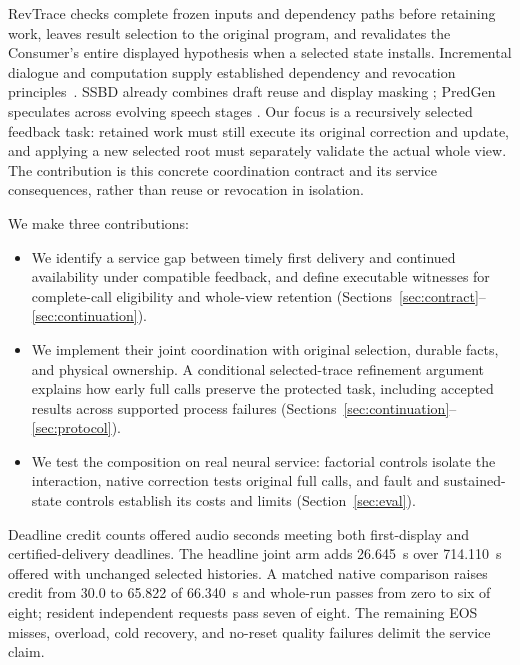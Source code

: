 RevTrace checks complete frozen inputs and dependency paths before
retaining work, leaves result selection to the original program, and
revalidates the Consumer's entire displayed hypothesis when a selected
state installs.
Incremental dialogue and computation supply established dependency and
revocation principles~\cite{schlangen2011incremental,hammer2014adapton,hammer2015names}.
SSBD already combines draft reuse and display masking
\cite{zeng2026ssbd}; PredGen speculates across evolving speech stages
\cite{li2025predgen}. Our focus is a recursively selected feedback task:
retained work must still execute its original correction and update, and
applying a new selected root must separately validate the actual whole
view. The contribution is this concrete coordination contract and its
service consequences, rather than reuse or revocation in isolation.

We make three contributions:
\begin{itemize}
\item We identify a service gap between timely first delivery and continued
  availability under compatible feedback, and define executable witnesses
  for complete-call eligibility and whole-view retention
  (Sections~\ref{sec:contract}--\ref{sec:continuation}).
\item We implement their joint coordination with original selection,
  durable facts, and physical ownership. A conditional selected-trace
  refinement argument explains how early full calls preserve the protected
  task, including accepted results across supported process failures
  (Sections~\ref{sec:continuation}--\ref{sec:protocol}).
\item We test the composition on real neural service: factorial controls
  isolate the interaction, native correction tests original full calls,
  and fault and sustained-state controls establish its costs and limits
  (Section~\ref{sec:eval}).
\end{itemize}

Deadline credit counts offered audio seconds meeting both first-display
and certified-delivery deadlines. The headline joint arm adds 26.645~s over
714.110~s offered with unchanged selected histories. A matched native
comparison raises credit from 30.0 to 65.822 of 66.340~s and whole-run
passes from zero to six of eight; resident independent requests pass
seven of eight. The remaining EOS misses, overload, cold recovery, and
no-reset quality failures delimit the service claim.
